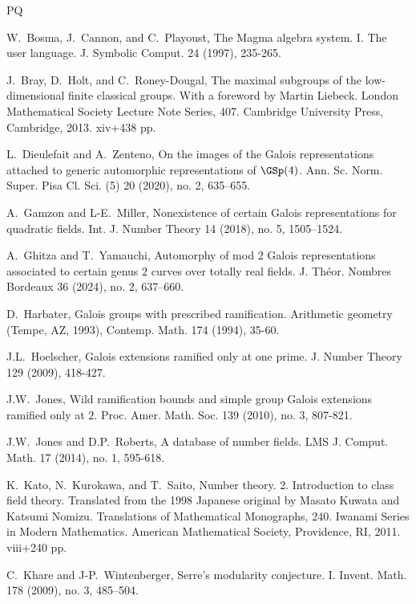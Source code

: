 \begin{thebibliography}{PQ}

  W.~Bosma, J.~Cannon, and C.~Playoust, The Magma algebra system. I. The user language. J. Symbolic Comput. 24 (1997), 235-265.

  J.~Bray, D.~Holt, and C.~Roney-Dougal, The maximal subgroups of the low-dimensional finite classical groups. With a foreword by Martin Liebeck. London Mathematical Society Lecture Note Series, 407. Cambridge University Press, Cambridge, 2013. xiv+438 pp.

  L.~Dieulefait and A.~Zenteno, On the images of the Galois representations attached to generic automorphic representations of $\GSp(4)$. Ann. Sc. Norm. Super. Pisa Cl. Sci. (5) 20 (2020), no. 2, 635–655.

  A.~Gamzon and L-E.~Miller,
  Nonexistence of certain Galois representations for quadratic fields.
  Int. J. Number Theory 14 (2018), no. 5, 1505–1524.

  A.~Ghitza and T.~Yamauchi, Automorphy of mod $2$ Galois representations associated to certain genus $2$ curves over totally real fields. J. Th\'eor. Nombres Bordeaux 36 (2024), no. 2, 637–660.

  D.~Harbater, Galois groups with prescribed ramification. Arithmetic geometry (Tempe, AZ, 1993), Contemp. Math. 174 (1994), 35-60.

  J.L.~Hoelscher, Galois extensions ramified only at one prime. J. Number Theory 129 (2009), 418-427.

  J.W.~Jones, Wild ramification bounds and simple group Galois extensions ramified only at $2$. Proc. Amer. Math. Soc. 139 (2010), no. 3, 807-821.

  J.W.~Jones and D.P.~Roberts, A database of number fields. LMS J. Comput. Math. 17 (2014), no. 1, 595-618.

  K.~Kato, N.~Kurokawa, and T.~Saito, Number theory. 2. Introduction to class field theory. Translated from the 1998 Japanese original by Masato Kuwata and Katsumi Nomizu. Translations of Mathematical Monographs, 240. Iwanami Series in Modern Mathematics. American Mathematical Society, Providence, RI, 2011. viii+240 pp.

  C.~Khare and J-P.~Wintenberger, Serre's modularity conjecture. I. Invent. Math. 178 (2009), no. 3, 485–504.


\end{thebibliography}
